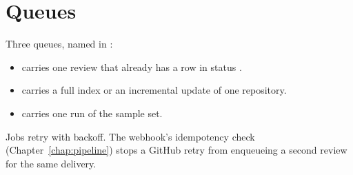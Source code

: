 \section{Queues}

Three queues, named in :

\begin{itemize}
  \item {} carries one review that already has a row in status .
  \item {} carries a full index or an incremental update of one repository.
  \item {} carries one run of the sample set.
\end{itemize}

Jobs retry with backoff. The webhook's idempotency check (Chapter~\ref{chap:pipeline}) stops a GitHub retry from enqueueing a second review for the same delivery.
